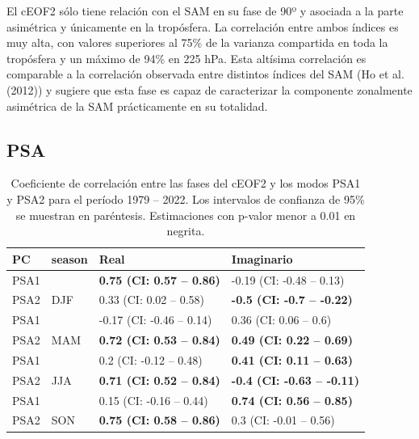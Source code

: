 \documentclass[12pt,oneside]{reedthesis}
\begin{document}
El cEOF2 sólo tiene relación con el SAM en su fase de 90º y asociada a la parte asimétrica y únicamente en la tropósfera.
La correlación entre ambos índices es muy alta, con valores superiores al 75\% de la varianza compartida en toda la tropósfera y un máximo de 94\% en 225 hPa.
Esta altísima correlación es comparable a la correlación observada entre distintos índices del SAM (Ho et al. (2012)) y sugiere que esta fase es capaz de caracterizar la componente zonalmente asimétrica de la SAM prácticamente en su totalidad.

\hypertarget{psa}{%
\subsection{PSA}\label{psa}}





\begin{table}

\caption{\label{tab:psa-eof2}Coeficiente de correlación entre las fases del cEOF2 y los modos PSA1 y PSA2 para el período 1979 -- 2022.
Los intervalos de confianza de 95\% se muestran en paréntesis.
Estimaciones con p-valor menor a 0.01 en negrita.}
\centering
\begin{tabular}[t]{ll>{}l>{}l}
\toprule
PC & season & Real & Imaginario\\
\midrule
PSA1 &  & \textbf{0.75 (CI: 0.57 -- 0.86)} & -0.19 (CI: -0.48 -- 0.13)\\
\cmidrule{1-1}
\cmidrule{3-4}
PSA2 & \multirow[t]{-2}{*}{\raggedright\arraybackslash DJF} & 0.33 (CI: 0.02 -- 0.58) & \textbf{-0.5 (CI: -0.7 -- -0.22)}\\
\cmidrule{1-4}
PSA1 &  & -0.17 (CI: -0.46 -- 0.14) & 0.36 (CI: 0.06 -- 0.6)\\
\cmidrule{1-1}
\cmidrule{3-4}
PSA2 & \multirow[t]{-2}{*}{\raggedright\arraybackslash MAM} & \textbf{0.72 (CI: 0.53 -- 0.84)} & \textbf{0.49 (CI: 0.22 -- 0.69)}\\
\cmidrule{1-4}
PSA1 &  & 0.2 (CI: -0.12 -- 0.48) & \textbf{0.41 (CI: 0.11 -- 0.63)}\\
\cmidrule{1-1}
\cmidrule{3-4}
PSA2 & \multirow[t]{-2}{*}{\raggedright\arraybackslash JJA} & \textbf{0.71 (CI: 0.52 -- 0.84)} & \textbf{-0.4 (CI: -0.63 -- -0.11)}\\
\cmidrule{1-4}
PSA1 &  & 0.15 (CI: -0.16 -- 0.44) & \textbf{0.74 (CI: 0.56 -- 0.85)}\\
\cmidrule{1-1}
\cmidrule{3-4}
PSA2 & \multirow[t]{-2}{*}{\raggedright\arraybackslash SON} & \textbf{0.75 (CI: 0.58 -- 0.86)} & 0.3 (CI: -0.01 -- 0.56)\\
\bottomrule
\end{tabular}
\end{table}
\end{document}
